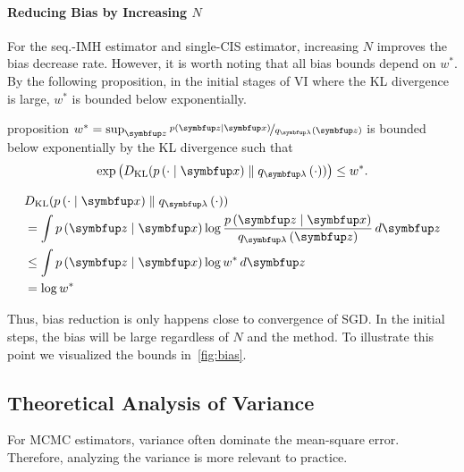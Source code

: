 \paragraph{Reducing Bias by Increasing \(N\)}
For the seq.-IMH estimator and single-CIS estimator, increasing \(N\) improves the bias decrease rate.
However, it is worth noting that all bias bounds depend on \(w^*\).
By the following proposition, in the initial stages of VI where the KL divergence is large, \(w^*\) is bounded below exponentially.

\begin{theoremEnd}{proposition}
  \(w^* = \sup_{\vz} \nicefrac{p\left(\vz\mid\vx\right)}{q_{\vlambda}\left(\vz\right)} \) is bounded below exponentially by the KL divergence such that
  \[
  \exp\left(\DKL{p\left(\cdot\mid\vx\right)}{ q_{\vlambda}\left(\cdot\right) }\right) \leq w^*.
  \]
\end{theoremEnd}
\begin{proofEnd}
  \begin{align}
    &\DKL{p\left(\cdot\mid\vx\right)}{ q_{\vlambda}\left(\cdot\right) } \\
    &= \int p\left(\vz\mid\vx\right) \log \frac{p\left(\vz\mid\vx\right)}{q_{\vlambda}\left(\vz\right)}\,d\vz \\
    &\leq \int p\left(\vz\mid\vx\right) \log w^* \, d\vz \\
    &= \log w^*
  \end{align}
\end{proofEnd}

Thus, bias reduction is only happens close to convergence of SGD.
In the initial steps, the bias will be large regardless of \(N\) and the method.
To illustrate this point we visualized the bounds in~\cref{fig:bias}.

\subsection{Theoretical Analysis of Variance}
For MCMC estimators, variance often dominate the mean-square error.
Therefore, analyzing the variance is more relevant to practice.

\vspace{-0.05in}
